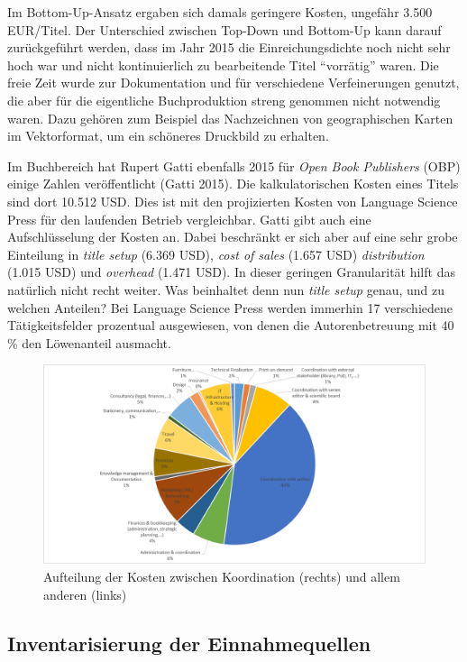 \documentclass[a4paper,
fontsize=11pt,
oneside,
numbers=noperiodatend,
parskip=half-,
bibliography=totoc,
final
]{scrartcl}
\begin{document}
Im Bottom-Up-Ansatz ergaben sich damals geringere Kosten, ungefähr 3.500
EUR/Titel. Der Unterschied zwischen Top-Down und Bottom-Up kann darauf
zurückgeführt werden, dass im Jahr 2015 die Einreichungsdichte noch
nicht sehr hoch war und nicht kontinuierlich zu bearbeitende Titel
\enquote{vorrätig} waren. Die freie Zeit wurde zur Dokumentation und für
verschiedene Verfeinerungen genutzt, die aber für die eigentliche
Buchproduktion streng genommen nicht notwendig waren. Dazu gehören zum
Beispiel das Nachzeichnen von geographischen Karten im Vektorformat, um
ein schöneres Druckbild zu erhalten.

Im Buchbereich hat Rupert Gatti ebenfalls 2015 für \emph{Open Book
Publishers} (OBP) einige Zahlen veröffentlicht (Gatti 2015). Die
kalkulatorischen Kosten eines Titels sind dort 10.512 USD. Dies ist mit
den projizierten Kosten von Language Science Press für den laufenden
Betrieb vergleichbar. Gatti gibt auch eine Aufschlüsselung der Kosten
an. Dabei beschränkt er sich aber auf eine sehr grobe Einteilung in
\emph{title setup} (6.369 USD), \emph{cost of sales} (1.657 USD)
\emph{distribution} (1.015 USD) und \emph{overhead} (1.471 USD). In
dieser geringen Granularität hilft das natürlich nicht recht weiter. Was
beinhaltet denn nun \emph{title setup} genau, und zu welchen Anteilen?
Bei Language Science Press werden immerhin 17 verschiedene
Tätigkeitsfelder prozentual ausgewiesen, von denen die Autorenbetreuung
mit 40\,\% den Löwenanteil ausmacht.

\begin{figure}[h!]
\centering
\includegraphics[width=\textwidth]{img/Kuchen.png}
\caption{Aufteilung der Kosten zwischen Koordination (rechts) und allem
anderen (links)}
\end{figure}

\hypertarget{inventarisierung-der-einnahmequellen}{%
\subsection{Inventarisierung der
Einnahmequellen}\label{inventarisierung-der-einnahmequellen}}
\end{document}
